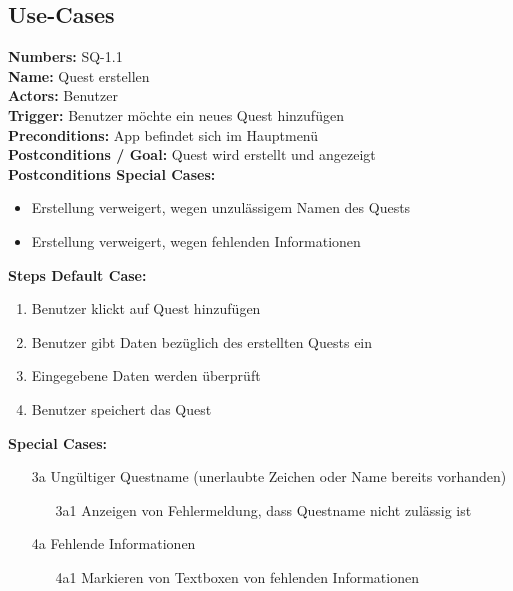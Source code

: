 \documentclass{article}
\begin{document}
\subsection{Use-Cases}


\textbf{Numbers:} SQ-1.1\\
\textbf{Name:} Quest erstellen\\
\textbf{Actors:} Benutzer\\
\textbf{Trigger:} Benutzer möchte ein neues Quest hinzufügen\\
\textbf{Preconditions:}  App befindet sich im Hauptmenü\\
\textbf{Postconditions / Goal:} Quest wird erstellt und angezeigt\\
\textbf{Postconditions Special Cases:}
\begin{itemize}
    \item Erstellung verweigert, wegen unzulässigem Namen des Quests
    \item Erstellung verweigert, wegen fehlenden Informationen
\end{itemize}
\textbf{Steps Default Case:} 
\begin{enumerate}
    \item Benutzer klickt auf Quest hinzufügen
    \item Benutzer gibt Daten bezüglich des erstellten Quests ein 
    \item Eingegebene Daten werden überprüft 
    \item Benutzer speichert das Quest
\end{enumerate}
\textbf{Special Cases:}
\begin{itemize}
    \item [3a] Ungültiger Questname (unerlaubte Zeichen oder Name bereits vorhanden)
    \begin{itemize}
        \item [3a1] Anzeigen von Fehlermeldung, dass Questname nicht zulässig ist
    \end{itemize}
    \item [4a] Fehlende Informationen
    \begin{itemize}
        \item [4a1] Markieren von Textboxen von fehlenden Informationen
    \end{itemize}
\end{itemize}
\end{document}
